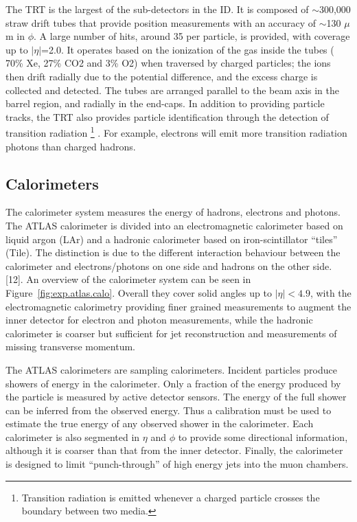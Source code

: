 The TRT is the largest of the sub-detectors in the ID.
It is composed of  $\sim$300,000 straw drift tubes 
that provide position measurements with an accuracy of $\sim$130 $\mu$m in $\phi$.
A large number of hits, around 35 per particle, is provided, with coverage up to
$|\eta|$=2.0. 
It operates based on the ionization of the gas inside the tubes ( 70\% Xe, 27\% CO2 and 3\% O2) 
when traversed by charged particles; the ions then drift radially due to
the potential difference, and the excess charge is collected and detected. 
The tubes are arranged parallel to the beam axis in the barrel region, and radially in the end-caps. 
In addition to providing particle tracks, 
the TRT also provides particle identification through
the detection of transition radiation
\footnote{Transition radiation is emitted whenever a charged particle 
crosses the boundary between two media.}
. For example, 
electrons will emit more transition radiation photons than charged hadrons.


\subsection{Calorimeters}


The calorimeter system measures the energy of hadrons, electrons and photons.
The ATLAS calorimeter is divided into an electromagnetic calorimeter based on liquid argon (LAr)
and a hadronic calorimeter based on  iron-scintillator ``tiles'' (Tile).
The distinction is due to the
different interaction behaviour between the calorimeter and electrons/photons on one side and hadrons on the other side. 
 [12].
An overview of the calorimeter system can be seen in Figure~\ref{fig:exp.atlas.calo}. 
Overall they cover solid angles up to $|\eta| < 4.9$, with the electromagnetic calorimetry providing finer 
grained measurements to augment the inner detector for electron and photon measurements, while
the hadronic calorimeter is coarser but sufficient for jet reconstruction and measurements
of missing transverse momentum.

The ATLAS calorimeters are sampling calorimeters. 
Incident particles produce showers of energy in the calorimeter. 
Only a fraction of the energy produced by the particle is
measured by active detector sensors. 
The energy of the full shower can be inferred from the observed
energy. Thus a calibration must be used to estimate the true energy
of any observed shower in the calorimeter. Each calorimeter is also segmented in $\eta$ and
$\phi$  to provide some directional information, although it is coarser than that from
the inner detector. Finally, the calorimeter is designed to limit ``punch-through'' of high
energy jets into the muon chambers.

